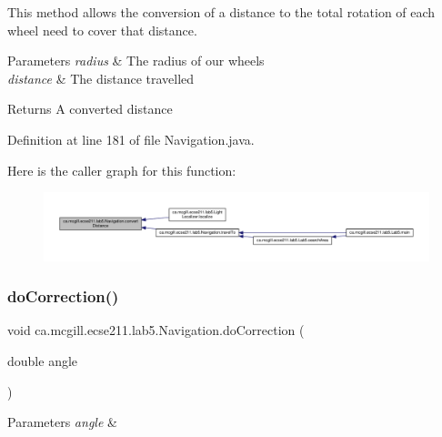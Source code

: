This method allows the conversion of a distance to the total rotation of each wheel need to cover that distance.


\begin{DoxyParams}{Parameters}
{\em radius} & The radius of our wheels \\
\hline
{\em distance} & The distance travelled \\
\hline
\end{DoxyParams}
\begin{DoxyReturn}{Returns}
A converted distance 
\end{DoxyReturn}


Definition at line 181 of file Navigation.\+java.

Here is the caller graph for this function\+:
\nopagebreak
\begin{figure}[H]
\begin{center}
\leavevmode
\includegraphics[width=350pt]{classca_1_1mcgill_1_1ecse211_1_1lab5_1_1_navigation_a85122ad723d0988c118866f367073be6_icgraph}
\end{center}
\end{figure}
\mbox{\label{classca_1_1mcgill_1_1ecse211_1_1lab5_1_1_navigation_a73a89ddd822e0ba1cfd7a29c18aa7aea}} 
\subsubsection{\texorpdfstring{do\+Correction()}{doCorrection()}}
{\footnotesize\ttfamily void ca.\+mcgill.\+ecse211.\+lab5.\+Navigation.\+do\+Correction (\begin{DoxyParamCaption}\item[{double}]{angle }\end{DoxyParamCaption})}


\begin{DoxyParams}{Parameters}
{\em angle} & \\
\hline
\end{DoxyParams}


